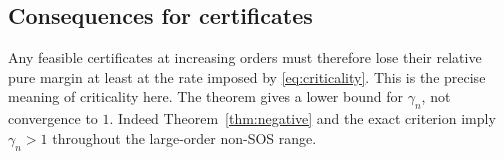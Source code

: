 \subsection{Consequences for certificates}
Any feasible certificates at increasing orders must therefore lose their
relative pure margin at least at the rate imposed by
\eqref{eq:criticality}. This is the precise meaning of criticality here.
The theorem gives a lower bound for $\gamma_n$, not convergence to $1$.
Indeed Theorem~\ref{thm:negative} and the exact criterion imply
$\gamma_n>1$ throughout the large-order non-SOS range.
